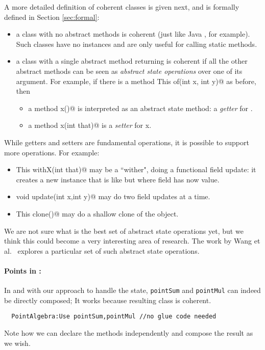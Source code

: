 A more detailed definition of coherent
classes is given next, and is formally defined in Section \ref{sec:formal}:
\begin{itemize}
\item a class with no abstract methods is coherent (just like Java
  \Q@Math@, for example). Such classes have no instances and are only useful for calling static methods.
\item a class with a single abstract \Q@static@ method returning \Q@This@
is coherent if all the other abstract methods can be seen as \emph{abstract state
operations} over one of its argument.
For example,
if there is a \Q@static method This of(int x, int y)@ as before,
then
\begin{itemize}
\item a method \Q@int x()@ is interpreted as an abstract state method: a \emph{getter} for \Q@x@.
\item a method \Q@void x(int that)@ is a \emph{setter} for x.
\end{itemize}
\end{itemize}
\noindent
While getters and setters are fundamental operations, it is possible to
support more operations. For example:
\begin{itemize}
\item \Q@method This withX(int that)@
may be a ``wither", doing a functional field update: it creates a new instance that is like \Q@this@ but where field \Q@x@ has now \Q@that@ value.
\item \Q@method void update(int x,int y)@
may do two field updates at a time.
\item\Q@method This clone()@ may do a shallow clone of the object.
\end{itemize}

We are not sure what is the best set of abstract state operations yet,
but we think this could become a very interesting area of research.
The work by Wang et al.~\cite{wang2016classless} explores a particular
set of such abstract state operations.

\paragraph{Points in \name:}
In \name and with our approach to handle the state, 
\lstinline{pointSum} and \lstinline{pointMul} can indeed be directly composed;
It works because resulting class is coherent.
\saveSpace
\begin{lstlisting}
  PointAlgebra:Use pointSum,pointMul //no glue code needed
\end{lstlisting}  
\saveSpace
\noindent
  Note how we can declare the methods independently and compose the result
  as we wish. 

